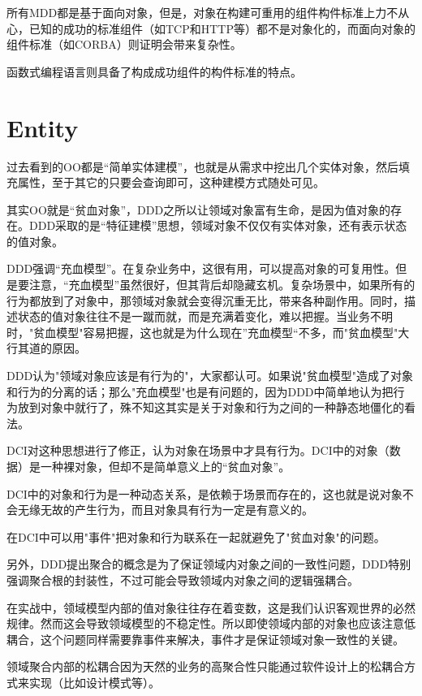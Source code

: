 所有MDD都是基于面向对象，但是，对象在构建可重用的组件构件标准上力不从心，已知的成功的标准组件（如TCP和HTTP等）都不是对象化的，而面向对象的组件标准（如CORBA）则证明会带来复杂性。

函数式编程语言则具备了构成成功组件的构件标准的特点。



\section{Entity}

过去看到的OO都是“简单实体建模”，也就是从需求中挖出几个实体对象，然后填充属性，至于其它的只要会查询即可，这种建模方式随处可见。


其实OO就是“贫血对象”，DDD之所以让领域对象富有生命，是因为值对象的存在。DDD采取的是“特征建模”思想，领域对象不仅仅有实体对象，还有表示状态的值对象。 

DDD强调“充血模型”。在复杂业务中，这很有用，可以提高对象的可复用性。但是要注意，“充血模型”虽然很好，但其背后却隐藏玄机。复杂场景中，如果所有的行为都放到了对象中，那领域对象就会变得沉重无比，带来各种副作用。同时，描述状态的值对象往往不是一蹴而就，而是充满着变化，难以把握。当业务不明时，"贫血模型"容易把握，这也就是为什么现在”充血模型“不多，而"贫血模型"大行其道的原因。

DDD认为"领域对象应该是有行为的"，大家都认可。如果说"贫血模型"造成了对象和行为的分离的话；那么"充血模型"也是有问题的，因为DDD中简单地认为把行为放到对象中就行了，殊不知这其实是关于对象和行为之间的一种静态地僵化的看法。

DCI对这种思想进行了修正，认为对象在场景中才具有行为。DCI中的对象（数据）是一种裸对象，但却不是简单意义上的“贫血对象”。

DCI中的对象和行为是一种动态关系，是依赖于场景而存在的，这也就是说对象不会无缘无故的产生行为，而且对象具有行为一定是有意义的。

在DCI中可以用"事件"把对象和行为联系在一起就避免了"贫血对象"的问题。

另外，DDD提出聚合的概念是为了保证领域内对象之间的一致性问题，DDD特别强调聚合根的封装性，不过可能会导致领域内对象之间的逻辑强耦合。

在实战中，领域模型内部的值对象往往存在着变数，这是我们认识客观世界的必然规律。然而这会导致领域模型的不稳定性。所以即使领域内部的对象也应该注意低耦合，这个问题同样需要靠事件来解决，事件才是保证领域对象一致性的关键。


领域聚合内部的松耦合因为天然的业务的高聚合性只能通过软件设计上的松耦合方式来实现（比如设计模式等）。

